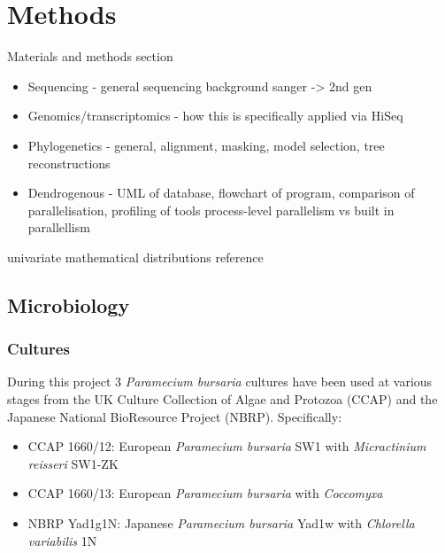 \graphicspath{{chapters/2.Methods/figures}}

\chapter{Methods}

Materials and methods section

\begin{itemize}
    \item Sequencing - general sequencing background sanger -> 2nd gen
    \item Genomics/transcriptomics - how this is specifically applied via HiSeq
    \item Phylogenetics - general, alignment, masking, model selection, tree reconstructions 
    \item Dendrogenous - UML of database, flowchart of program, comparison of parallelisation, profiling of tools process-level parallelism vs built in parallellism
\end{itemize}

univariate mathematical distributions reference\citep{Leemis2008}




\section{Microbiology}


\subsection{Cultures}

During this project 3 \textit{Paramecium bursaria} cultures have been used at various stages from 
the UK Culture Collection of Algae and Protozoa (CCAP) and the Japanese National BioResource Project (NBRP).
Specifically:
\begin{itemize}
    \item CCAP 1660/12: European \textit{Paramecium bursaria} SW1 with \textit{Micractinium reisseri} SW1-ZK \citep{Hoshina2010}
    \item CCAP 1660/13: European \textit{Paramecium bursaria} with \textit{Coccomyxa} \citep{}
    \item NBRP Yad1g1N: Japanese \textit{Paramecium bursaria} Yad1w with \textit{Chlorella variabilis} 1N \citep{}
\end{itemize}



